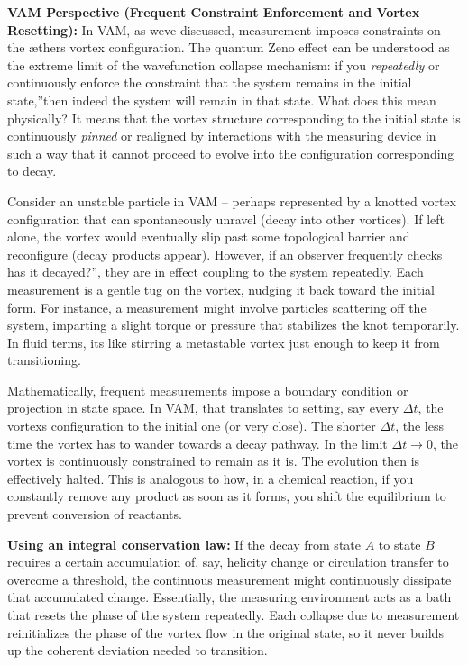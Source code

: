 \documentclass[a4paper, aps,preprint,superscriptaddress, 12pt]{revtex4}
\begin{document}
\textbf{VAM Perspective (Frequent Constraint Enforcement and Vortex Resetting):} In VAM, as we\rqs ve discussed, measurement imposes constraints on the æther\rqs s vortex configuration. The quantum Zeno effect can be understood as the extreme limit of the wavefunction collapse mechanism: if you \textit{repeatedly} or continuously enforce the constraint that \grqq the system remains in the initial state,\textquotedblright then indeed the system will remain in that state. What does this mean physically? It means that the vortex structure corresponding to the initial state is continuously \textit{pinned} or realigned by interactions with the measuring device in such a way that it cannot proceed to evolve into the configuration corresponding to decay.


Consider an unstable particle in VAM – perhaps represented by a knotted vortex configuration that can spontaneously unravel (decay into other vortices). If left alone, the vortex would eventually slip past some topological barrier and reconfigure (decay products appear). However, if an observer frequently checks \grqq has it decayed?\textquotedblright, they are in effect coupling to the system repeatedly. Each measurement is a gentle tug on the vortex, nudging it back toward the initial form. For instance, a measurement might involve particles scattering off the system, imparting a slight torque or pressure that stabilizes the knot temporarily. In fluid terms, it\rqs s like stirring a metastable vortex just enough to keep it from transitioning.


Mathematically, frequent measurements impose a boundary condition or projection in state space. In VAM, that translates to setting, say every $\Delta t$, the vortex\rqs s configuration to the initial one (or very close). The shorter $\Delta t$, the less time the vortex has to wander towards a decay pathway. In the limit $\Delta t \to 0$, the vortex is continuously constrained to remain as it is. The evolution then is effectively halted. This is analogous to how, in a chemical reaction, if you constantly remove any product as soon as it forms, you shift the equilibrium to prevent conversion of reactants.


\textbf{Using an integral conservation law:} If the decay from state $A$ to state $B$ requires a certain accumulation of, say, helicity change or circulation transfer to overcome a threshold, the continuous measurement might continuously dissipate that accumulated change. Essentially, the measuring environment acts as a bath that resets the phase of the system repeatedly. Each collapse due to measurement reinitializes the phase of the vortex flow in the original state, so it never builds up the coherent deviation needed to transition.
\end{document}
